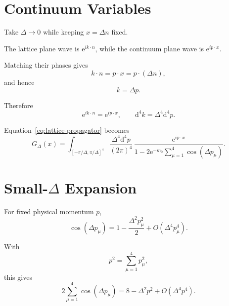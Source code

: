 \documentclass[11pt,a4paper,oneside]{article}
\newcommand{\ee}{\mathrm{e}}
\newcommand{\dd}{\mathrm{d}}
\begin{document}
	
	\section{Continuum Variables}
	
	Take $\Delta\to0$ while keeping $x=\Delta n$ fixed.
	
	The lattice plane wave is $\ee^{ik\cdot n}$, while the continuum plane wave is
	$\ee^{ip\cdot x}$.
	
	Matching their phases gives
	\begin{equation}
		k\cdot n
		=
		p\cdot x
		=
		p\cdot(\Delta n),
	\end{equation}
	and hence
	\begin{equation}
		\boxed{
			k=\Delta p.
		}
		\label{eq:k-delta-p}
	\end{equation}
	
	Therefore
	\begin{equation}
		\ee^{ik\cdot n}
		=
		\ee^{ip\cdot x},
		\qquad
		\dd^4k
		=
		\Delta^4\dd^4p.
	\end{equation}
	
	Equation~\eqref{eq:lattice-propagator} becomes
	\begin{equation}
		G_\Delta(x)
		=
		\int_{[-\pi/\Delta,\pi/\Delta]^4}
		\frac{\Delta^4\dd^4p}{(2\pi)^4}
		\,
		\frac{
			\ee^{ip\cdot x}
		}{
			1
			-
			2\ee^{-m_0}
			\displaystyle\sum_{\mu=1}^{4}
			\cos(\Delta p_\mu)
		}.
		\label{eq:propagator-p}
	\end{equation}
	
	
	\section{Small-$\Delta$ Expansion}
	
	For fixed physical momentum $p$,
	\begin{equation}
		\cos(\Delta p_\mu)
		=
		1
		-
		\frac{\Delta^2p_\mu^2}{2}
		+
		O(\Delta^4p_\mu^4).
	\end{equation}
	
	With
	\[
	p^2
	=
	\sum_{\mu=1}^{4}p_\mu^2,
	\]
	this gives
	\begin{equation}
		2\sum_{\mu=1}^{4}\cos(\Delta p_\mu)
		=
		8
		-
		\Delta^2p^2
		+
		O(\Delta^4p^4).
	\end{equation}
	
\end{document}
